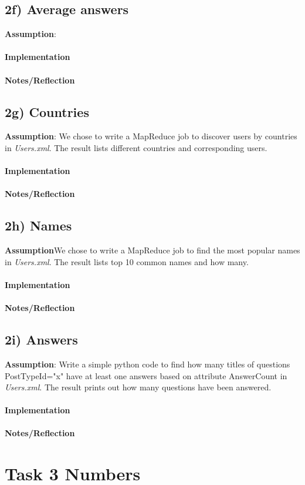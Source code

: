 \documentclass[fleqn,10pt]{wlscirep}
\begin{document}
\subsection*{2f) Average answers}
\textbf{Assumption}: \\ \\
\textbf{Implementation}  \\ \\
\textbf{Notes/Reflection}


\subsection*{2g) Countries }
\textbf{Assumption}: We chose to write a MapReduce job to discover users by countries in \textit{Users.xml}. The result lists different countries and corresponding users. \\ \\
\textbf{Implementation}  \\ \\
\textbf{Notes/Reflection}


\subsection*{2h) Names}
\textbf{Assumption}We chose to write a MapReduce job to find the most popular names in \textit{Users.xml}. The result lists top 10 common names and how many.  \\ \\
\textbf{Implementation}  \\ \\
\textbf{Notes/Reflection}


\subsection*{2i) Answers }
\textbf{Assumption}: Write a simple python code to find how many titles of questions PostTypeId="x" have at least one answers based on attribute AnswerCount in \textit{Users.xml}. The result prints out how many questions have been answered.  \\ \\
\textbf{Implementation}  \\ \\
\textbf{Notes/Reflection}


\section*{Task 3 Numbers}
\end{document}

